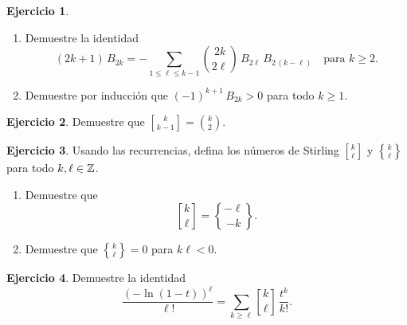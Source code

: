 \documentclass{article}
\DeclareRobustCommand{\Stirling}{\genfrac\{\}{0pt}{}}
\DeclareRobustCommand{\stirling}{\genfrac[]{0pt}{}}
\theoremstyle{definition}
\newtheorem{ejerc}{Ejercicio}
\begin{document}
\begin{ejerc}
~

\begin{enumerate}
\item Demuestre la identidad
$$(2k + 1)\,B_{2k} = -\sum_{1 \le \ell \le k-1} {2k \choose 2\ell}\,B_{2\ell}\,B_{2\,(k-\ell)} \quad \text{para }k\ge 2.$$


\item Demuestre por inducción que $(-1)^{k+1}\,B_{2k} > 0$ para todo $k \ge 1$.
\end{enumerate}
\end{ejerc}

\begin{ejerc}
Demuestre que $\stirling{k}{k-1} = {k \choose 2}$.
\end{ejerc}

\begin{ejerc}
Usando las recurrencias, defina los números de Stirling $\stirling{k}{\ell}$ y $\Stirling{k}{\ell}$ para todo $k,\ell \in \mathbb{Z}$.

\begin{enumerate}
\item Demuestre que
$$\stirling{k}{\ell} = \Stirling{-\ell}{-k}.$$

\item Demuestre que $\Stirling{k}{\ell} = 0$ para $k\ell < 0$.
\end{enumerate}
\end{ejerc}

\begin{ejerc}
Demuestre la identidad
$$\frac{(-\ln (1-t))^\ell}{\ell!} = \sum_{k \ge \ell} \stirling{k}{\ell}\,\frac{t^k}{k!}.$$
\end{ejerc}
\end{document}
